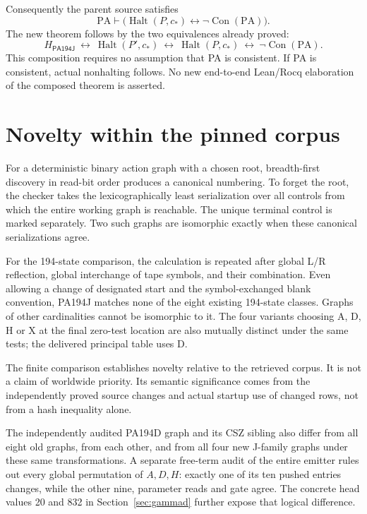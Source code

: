 \documentclass[11pt,letterpaper]{article}
\newcommand{\PA}{\mathrm{PA}}
\newcommand{\Con}{\operatorname{Con}}
\newcommand{\Halt}{\operatorname{Halt}}
\newcommand{\M}{\mathsf{PA194J}}
\begin{document}
Consequently the parent source satisfies
\[
 \PA\vdash\bigl(\Halt(P,c_*)\leftrightarrow\neg\Con(\PA)\bigr).
\]
The new theorem follows by the two equivalences already proved:
\[
 H_\M\ \longleftrightarrow\ \Halt(P',c_*)\
 \longleftrightarrow\ \Halt(P,c_*)\
 \longleftrightarrow\ \neg\Con(\PA).
\]
This composition requires no assumption that PA is consistent. If PA is
consistent, actual nonhalting follows. No new end-to-end Lean/Rocq
elaboration of the composed theorem is asserted.



\section{Novelty within the pinned corpus}
\label{sec:novelty}

For a deterministic binary action graph with a chosen root, breadth-first
discovery in read-bit order produces a canonical numbering. To forget
the root, the checker takes the lexicographically least serialization
over all controls from which the entire working graph is reachable.
The unique terminal control is marked separately. Two such graphs are
isomorphic exactly when these canonical serializations agree.

For the 194-state comparison, the calculation is repeated after global
L/R reflection, global interchange of tape symbols, and their combination.
Even allowing a change of designated start and the symbol-exchanged blank
convention, PA194J matches none of the eight existing 194-state classes.
Graphs of other cardinalities cannot be isomorphic to it. The four
variants choosing A, D, H or X at the final zero-test location are also
mutually distinct under the same tests; the delivered principal table
uses D.

The finite comparison establishes novelty relative to the retrieved
corpus. It is not a claim of worldwide priority. Its semantic significance
comes from the independently proved source changes and actual startup
use of changed rows, not from a hash inequality alone.

The independently audited PA194D graph and its CSZ sibling also differ
from all eight old graphs, from each other, and from all four new J-family
graphs under these same transformations. A separate free-term audit of
the entire emitter rules out every global permutation of \(A,D,H\):
exactly one of its ten pushed entries changes, while the other nine,
parameter reads and gate agree. The concrete head values 20 and 832 in
Section~\ref{sec:gammad} further expose that logical difference.
\end{document}

